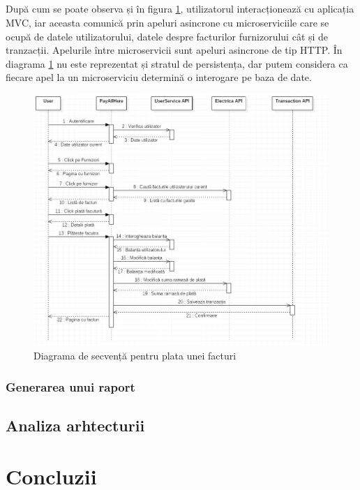 \documentclass[12pt]{report}
\begin{document}
  	\paragraph{}După cum se poate observa și în figura \ref{utilizseq}, utilizatorul interacționează cu aplicația MVC, iar aceasta comunică prin apeluri asincrone cu microserviciile care se ocupă de datele utilizatorului, datele despre facturilor furnizorului cât și de tranzacții. Apelurile între microservicii sunt apeluri asincrone de tip HTTP. În diagrama \ref{utilizseq} nu este reprezentat și stratul de persistența, dar putem considera ca fiecare apel la un microserviciu determină o interogare pe baza de date.
  	\begin{figure}[h]
  	\centering
  	\includegraphics[scale=0.9]{utilizseq}
	\caption{Diagrama de secvență pentru plata unei facturi}  
	\label{utilizseq}
  	\end{figure}
  	\subsection{Generarea unui raport}
  	\section{Analiza arhtecturii}
\chapter{Concluzii}



\end{document}
